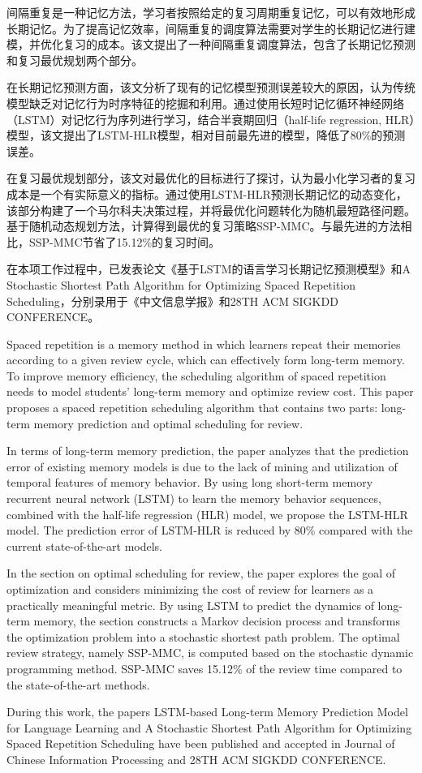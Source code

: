 \begin{cabstract}
间隔重复是一种记忆方法，学习者按照给定的复习周期重复记忆，可以有效地形成长期记忆。为了提高记忆效率，间隔重复的调度算法需要对学生的长期记忆进行建模，并优化复习的成本。该文提出了一种间隔重复调度算法，包含了长期记忆预测和复习最优规划两个部分。

在长期记忆预测方面，该文分析了现有的记忆模型预测误差较大的原因，认为传统模型缺乏对记忆行为时序特征的挖掘和利用。通过使用长短时记忆循环神经网络（LSTM）对记忆行为序列进行学习，结合半衰期回归（half-life regression, HLR）模型，该文提出了LSTM-HLR模型，相对目前最先进的模型，降低了80\%的预测误差。

在复习最优规划部分，该文对最优化的目标进行了探讨，认为最小化学习者的复习成本是一个有实际意义的指标。通过使用LSTM-HLR预测长期记忆的动态变化，该部分构建了一个马尔科夫决策过程，并将最优化问题转化为随机最短路径问题。基于随机动态规划方法，计算得到最优的复习策略SSP-MMC。与最先进的方法相比，SSP-MMC节省了15.12\%的复习时间。

在本项工作过程中，已发表论文《基于LSTM的语言学习长期记忆预测模型》和A Stochastic Shortest Path Algorithm for Optimizing Spaced Repetition Scheduling，分别录用于《中文信息学报》和28TH ACM SIGKDD CONFERENCE。
\end{cabstract}

\begin{eabstract}
  Spaced repetition is a memory method in which learners repeat their memories according to a given review cycle, which can effectively form long-term memory. To improve memory efficiency, the scheduling algorithm of spaced repetition needs to model students' long-term memory and optimize review cost. This paper proposes a spaced repetition scheduling algorithm that contains two parts: long-term memory prediction and optimal scheduling for review.

  In terms of long-term memory prediction, the paper analyzes that the prediction error of existing memory models is due to the lack of mining and utilization of temporal features of memory behavior. By using long short-term memory recurrent neural network (LSTM) to learn the memory behavior sequences, combined with the half-life regression (HLR) model, we propose the LSTM-HLR model. The prediction error of LSTM-HLR is reduced by 80\% compared with the current state-of-the-art models.

  In the section on optimal scheduling for review, the paper explores the goal of optimization and considers minimizing the cost of review for learners as a practically meaningful metric. By using LSTM to predict the dynamics of long-term memory, the section constructs a Markov decision process and transforms the optimization problem into a stochastic shortest path problem. The optimal review strategy, namely SSP-MMC, is computed based on the stochastic dynamic programming method. SSP-MMC saves 15.12\% of the review time compared to the state-of-the-art methods.

  During this work, the papers LSTM-based Long-term Memory Prediction Model for Language Learning and A Stochastic Shortest Path Algorithm for Optimizing Spaced Repetition Scheduling have been published and accepted in Journal of Chinese Information Processing and 28TH ACM SIGKDD CONFERENCE.
\end{eabstract}
